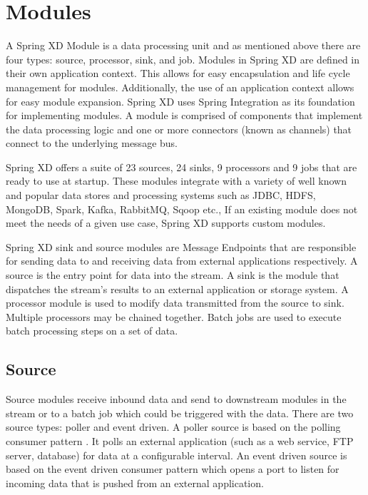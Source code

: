 \section{Modules}
\label{sec:Modules}
A Spring XD Module \cite{modules} is a data processing unit and as mentioned above
there are four types: source, processor, sink, and job. Modules in Spring XD are defined 
in their own application context. This allows for easy encapsulation and life cycle 
management for modules. Additionally, the use of an application context allows for easy 
module expansion.  Spring XD uses Spring Integration \cite{spring-integration-reference} 
as its foundation for implementing modules. A module is comprised of components that
implement the data processing logic and one or more connectors (known as channels)
that connect to the underlying message bus.

\par

Spring XD offers a suite of 23 sources, 24 sinks, 9 processors and 9 jobs that are ready 
to use at startup.  These modules integrate with a variety of well known and popular
data stores and processing systems such as JDBC, HDFS, MongoDB, Spark, Kafka, RabbitMQ,
Sqoop etc.,  If an existing module does not meet the needs of a given use case, Spring XD
supports custom modules.

Spring XD sink and source modules are Message Endpoints 
\cite{enterprise-integration-pattern-message-endpoint} 
that are responsible for sending data to and receiving data from external applications
respectively. A source is the entry point for data into the stream. A sink is
the module that dispatches the stream's results to an external application or storage system.
A processor module is used to modify data transmitted from the source to sink.
Multiple processors may be chained together. Batch jobs are used to execute batch
processing steps on a set of data.

\par

\subsection{Source}
Source modules receive inbound data and send to downstream modules in the stream or to a batch job
which could be triggered with the data. There are two source types: poller and event driven.
A poller source is based on the polling consumer pattern \cite{enterprise-integration-pattern-pollingconsumer}.
It polls an external application (such as a web service, FTP server, database) for data at a
configurable interval. An event driven source is based on the event driven
consumer pattern \cite{enterprise-integration-pattern-eventdrivenconsumer} which
opens a port to listen for incoming data that is pushed from an external application.

